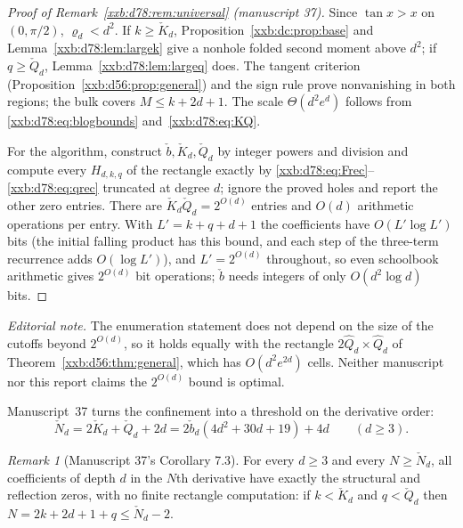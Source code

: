 \documentclass[11pt,a4paper]{article}
\numberwithin{equation}{section}
\theoremstyle{definition}
\theoremstyle{remark}
\newtheorem{remark}[theorem]{Remark}
\theoremstyle{plain}
\begin{document}
\begin{proof}[Proof of Remark~\ref{xxb:d78:rem:universal} (manuscript 37)]
Since $\tan x>x$ on $(0,\pi/2)$, $\varrho_d<d^2$.  If $k\ge\check K_d$,
Proposition~\ref{xxb:dc:prop:base} and Lemma~\ref{xxb:d78:lem:largek} give a
nonhole folded second moment above $d^2$; if $q\ge\check Q_d$,
Lemma~\ref{xxb:d78:lem:largeq} does.  The tangent criterion
(Proposition~\ref{xxb:d56:prop:general}) and the sign rule prove
nonvanishing in both regions; the bulk covers $M\le k+2d+1$.  The scale
$\Theta(d^2e^d)$ follows from \eqref{xxb:d78:eq:blogbounds}
and~\eqref{xxb:d78:eq:KQ}.

For the algorithm, construct $\check b,\check K_d,\check Q_d$ by integer powers
and division and compute every $H_{d,k,q}$ of the rectangle exactly by
\eqref{xxb:d78:eq:Frec}--\eqref{xxb:d78:eq:qrec} truncated at degree $d$;
ignore the proved holes and report the other zero entries.  There are
$\check K_d\check Q_d=2^{O(d)}$ entries and $O(d)$ arithmetic operations per
entry.  With $L'=k+q+d+1$ the coefficients have $O(L'\log L')$ bits (the
initial falling product has this bound, and each step of the three-term
recurrence adds $O(\log L')$), and $L'=2^{O(d)}$ throughout, so even schoolbook
arithmetic gives $2^{O(d)}$ bit operations; $\check b$ needs integers of only
$O(d^2\log d)$ bits.
\end{proof}

\emph{Editorial note.}  The enumeration statement does not depend on the size
of the cutoffs beyond $2^{O(d)}$, so it holds equally with the rectangle
$2\widehat Q_d\times\widehat Q_d$ of Theorem~\ref{xxb:d56:thm:general}, which has
$O(d^2e^{2d})$ cells.  Neither manuscript nor this report claims the
$2^{O(d)}$ bound is optimal.

Manuscript~37 turns the confinement into a threshold on the derivative
order:
\begin{equation}\label{xxb:d78:eq:T}
 \check N_d=2\check K_d+\check Q_d+2d=2\check b_d(4d^2+30d+19)+4d\qquad(d\ge3).
\end{equation}

\begin{remark}[Manuscript 37's Corollary 7.3]\label{xxb:d78:rem:tailorder}
For every $d\ge3$ and every $N\ge\check N_d$, all coefficients of depth $d$ in
the $N$th derivative have exactly the structural and reflection zeros, with no
finite rectangle computation: if $k<\check K_d$ and $q<\check Q_d$ then
$N=2k+2d+1+q\le\check N_d-2$.
\end{remark}
\end{document}
